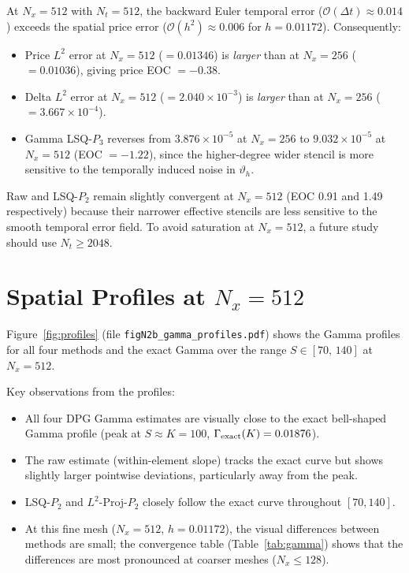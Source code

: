 \documentclass[11pt,a4paper]{article}
\newcommand{\Nx}{N_x}
\newcommand{\bigo}[1]{\mathcal{O}(#1)}
\newcommand{\vth}{\vartheta}
\begin{document}
At $\Nx = 512$ with $N_t = 512$, the backward Euler temporal error
($\bigo{\Delta t} \approx 0.014$) exceeds the spatial price error
($\bigo{h^2} \approx 0.006$ for $h = 0.01172$).
Consequently:
\begin{itemize}[noitemsep]
  \item Price $L^2$ error at $\Nx=512$ ($= 0.01346$) is \emph{larger} than
        at $\Nx=256$ ($= 0.01036$), giving price EOC $= -0.38$.
  \item Delta $L^2$ error at $\Nx=512$ ($= 2.040\times10^{-3}$) is
        \emph{larger} than at $\Nx=256$ ($= 3.667\times10^{-4}$).
  \item Gamma LSQ-$P_3$ reverses from $3.876\times10^{-5}$ at $\Nx=256$
        to $9.032\times10^{-5}$ at $\Nx=512$ (EOC $= -1.22$), since the
        higher-degree wider stencil is more sensitive to the temporally
        induced noise in $\vth_h$.
\end{itemize}
Raw and LSQ-$P_2$ remain slightly convergent at $\Nx=512$ (EOC 0.91 and
1.49 respectively) because their narrower effective stencils are less
sensitive to the smooth temporal error field.  To avoid saturation at
$\Nx = 512$, a future study should use $N_t \ge 2048$.

\section{Spatial Profiles at $\Nx = 512$}

Figure~\ref{fig:profiles} (file \texttt{figN2b\_gamma\_profiles.pdf}) shows
the Gamma profiles for all four methods and the exact Gamma over the range
$S \in [70,\,140]$ at $\Nx = 512$.

Key observations from the profiles:
\begin{itemize}[noitemsep]
  \item All four DPG Gamma estimates are visually close to the exact
        bell-shaped Gamma profile (peak at $S \approx K = 100$,
        $\Gamma_{\rm exact}(K) = 0.01876$).
  \item The raw estimate (within-element slope) tracks the exact curve
        but shows slightly larger pointwise deviations, particularly
        away from the peak.
  \item LSQ-$P_2$ and $L^2$-Proj-$P_2$ closely follow the exact curve
        throughout $[70, 140]$.
  \item At this fine mesh ($\Nx = 512$, $h = 0.01172$), the visual
        differences between methods are small; the convergence table
        (Table~\ref{tab:gamma}) shows that the differences are most
        pronounced at coarser meshes ($\Nx \le 128$).
\end{itemize}
\end{document}
